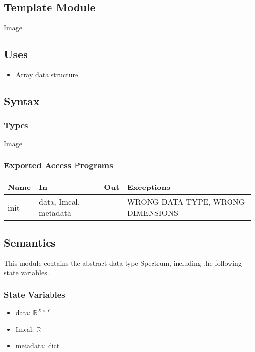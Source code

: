\documentclass[12pt, titlepage]{article}
\begin{document}
\subsection{Template Module}
Image

\subsection{Uses}
\begin{itemize}
    \item \hyperref[Mod:Array]{Array data structure}
\end{itemize}

\subsection{Syntax}
\subsubsection{Types}
Image

\subsubsection{Exported Access Programs}

\begin{center}
    \begin{tabular}{p{1.5cm} p{4cm} p{4cm} p{4cm}}
        \toprule
        \textbf{Name} & \textbf{In} & \textbf{Out} & \textbf{Exceptions} \\
        \midrule
        init & data, Imcal, metadata & - & WRONG DATA TYPE, WRONG DIMENSIONS \\
        \bottomrule
    \end{tabular}
\end{center}

\subsection{Semantics}
This module contains the abstract data type Spectrum, including the following state variables.
\subsubsection{State Variables}
\begin{itemize}
    \item data: $\mathbb{R}^{X \times Y}$
    \item Imcal: $\mathbb{R}$
    \item metadata: dict
\end{itemize}
\end{document}
